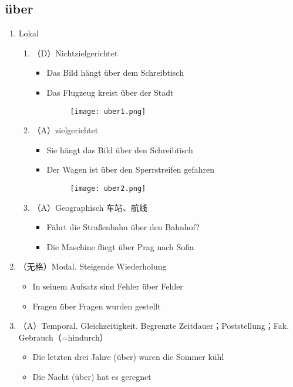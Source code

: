 \documentclass[UTF8]{report}
\begin{document}
\subsection{über}
\begin{enumerate}
    \item Lokal
    \begin{enumerate}
        \item （D）Nichtzielgerichtet
        \begin{itemize}
            \item Das Bild hängt über dem Schreibtisch
            \item Das Flugzeug kreist über der Stadt
            \begin{figure}[H]
                \centering
                \texttt{[image: uber1.png]}
            \end{figure}
        \end{itemize}
        \item （A）zielgerichtet
        \begin{itemize}
            \item Sie hängt das Bild über den Schreibtisch
            \item Der Wagen ist über den Sperrstreifen gefahren
            \begin{figure}[H]
                \centering
                \texttt{[image: uber2.png]}
            \end{figure}
        \end{itemize}
        \item（A）Geographisch 车站、航线
        \begin{itemize}
            \item Fährt die Straßenbahn über den Bahnhof?
            \item Die Maschine fliegt über Prag nach Sofia
        \end{itemize}
    \end{enumerate}
    \item（无格）Modal. Steigende Wiederholung
    \begin{itemize}
        \item In seinem Aufsatz sind Fehler über Fehler
        \item Fragen über Fragen wurden gestellt
    \end{itemize}
    \item（A）Temporal. Gleichzeitigkeit. Begrenzte Zeitdauer；Poststellung；Fak. Gebrauch（=hindurch）
    \begin{itemize}
        \item Die letzten drei Jahre (über) waren die Sommer kühl
        \item Die Nacht (über) hat es geregnet
    \end{itemize}
\end{enumerate}
\end{document}

